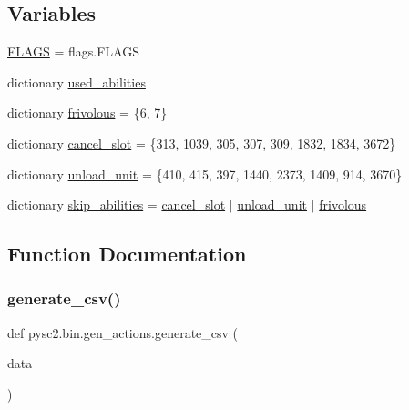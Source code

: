 \subsection*{Variables}
\begin{DoxyCompactItemize}
\item 
\mbox{\hyperlink{namespacepysc2_1_1bin_1_1gen__actions_aefe00fb4c7c7afb7a385c6e5ab636932}{F\+L\+A\+GS}} = flags.\+F\+L\+A\+GS
\item 
dictionary \mbox{\hyperlink{namespacepysc2_1_1bin_1_1gen__actions_a5a093178fed9158dfcd923fc9fc58143}{used\+\_\+abilities}}
\item 
dictionary \mbox{\hyperlink{namespacepysc2_1_1bin_1_1gen__actions_a6737a7178651d41e1d24b7a1c1bb1d28}{frivolous}} = \{6, 7\}
\item 
dictionary \mbox{\hyperlink{namespacepysc2_1_1bin_1_1gen__actions_a1ae1aae9850befe1a62c33fd578801f5}{cancel\+\_\+slot}} = \{313, 1039, 305, 307, 309, 1832, 1834, 3672\}
\item 
dictionary \mbox{\hyperlink{namespacepysc2_1_1bin_1_1gen__actions_a6216003b8762b47f8435217866a835dc}{unload\+\_\+unit}} = \{410, 415, 397, 1440, 2373, 1409, 914, 3670\}
\item 
dictionary \mbox{\hyperlink{namespacepysc2_1_1bin_1_1gen__actions_a0307e2d975de651565c206a6c6a01c8f}{skip\+\_\+abilities}} = \mbox{\hyperlink{namespacepysc2_1_1bin_1_1gen__actions_a1ae1aae9850befe1a62c33fd578801f5}{cancel\+\_\+slot}} $\vert$ \mbox{\hyperlink{namespacepysc2_1_1bin_1_1gen__actions_a6216003b8762b47f8435217866a835dc}{unload\+\_\+unit}} $\vert$ \mbox{\hyperlink{namespacepysc2_1_1bin_1_1gen__actions_a6737a7178651d41e1d24b7a1c1bb1d28}{frivolous}}
\end{DoxyCompactItemize}


\subsection{Function Documentation}
\mbox{\label{namespacepysc2_1_1bin_1_1gen__actions_ae7964605a3f83d58077a0df3aa2c3457}} 
\subsubsection{\texorpdfstring{generate\+\_\+csv()}{generate\_csv()}}
{\footnotesize\ttfamily def pysc2.\+bin.\+gen\+\_\+actions.\+generate\+\_\+csv (\begin{DoxyParamCaption}\item[{}]{data }\end{DoxyParamCaption})}

